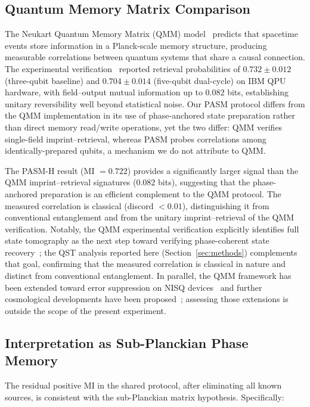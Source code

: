 \documentclass[12pt,a4paper]{article}
\begin{document}
\subsection{Quantum Memory Matrix Comparison}

The Neukart Quantum Memory Matrix (QMM) model~\cite{neukart2025,neukart2026qip} predicts that spacetime events store information in a Planck-scale memory structure, producing measurable correlations between quantum systems that share a causal connection. The experimental verification~\cite{neukart2026qip} reported retrieval probabilities of $0.732 \pm 0.012$ (three-qubit baseline) and $0.704 \pm 0.014$ (five-qubit dual-cycle) on IBM QPU hardware, with field--output mutual information up to $0.082$ bits, establishing unitary reversibility well beyond statistical noise. Our PASM protocol differs from the QMM implementation in its use of phase-anchored state preparation rather than direct memory read/write operations, yet the two differ: QMM verifies single-field imprint--retrieval, whereas PASM probes correlations among identically-prepared qubits, a mechanism we do not attribute to QMM.

The PASM-H result (MI $= 0.722$) provides a significantly larger signal than the QMM imprint--retrieval signatures ($0.082$ bits), suggesting that the phase-anchored preparation is an efficient complement to the QMM protocol. The measured correlation is classical (discord $< 0.01$), distinguishing it from conventional entanglement and from the unitary imprint--retrieval of the QMM verification. Notably, the QMM experimental verification explicitly identifies full state tomography as the next step toward verifying phase-coherent state recovery~\cite{neukart2026qip}; the QST analysis reported here (Section~\ref{sec:methods}) complements that goal, confirming that the measured correlation is classical in nature and distinct from conventional entanglement. In parallel, the QMM framework has been extended toward error suppression on NISQ devices~\cite{neukart2026qec} and further cosmological developments have been proposed~\cite{neukart2025dm,neukart2025de}; assessing those extensions is outside the scope of the present experiment.

\subsection{Interpretation as Sub-Planckian Phase Memory}

The residual positive MI in the shared protocol, after eliminating all known sources, is consistent with the sub-Planckian matrix hypothesis. Specifically:
\end{document}
